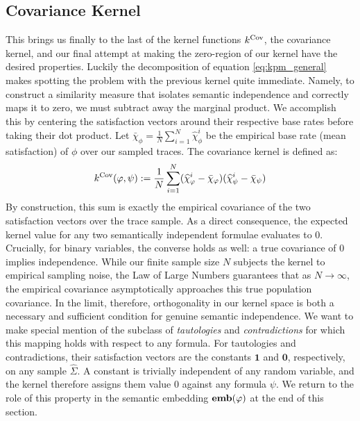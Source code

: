 \documentclass[titlepage,a4paper,11pt]{report}
\begin{document}
    \subsection{Covariance Kernel}
    This brings us finally to the last of the kernel functions $k^{\mathrm{Cov}}$, the covariance kernel, and our final attempt at making  the zero-region of our kernel have the desired properties. Luckily the decomposition of equation \eqref{eq:kpm_general} makes spotting the problem with the previous kernel quite immediate. Namely, to construct a similarity measure that isolates semantic independence and correctly maps it to zero, we must subtract away the marginal product. We accomplish this by centering the satisfaction vectors around their respective base rates before taking their dot product. Let $\bar{\chi}_\phi = \frac{1}{N}\sum_{i=1}^N \widehat{\chi}^i_\phi$ be the empirical base rate (mean satisfaction) of $\phi$ over our sampled traces. The covariance kernel is defined as:
    \begin{equation}\label{eq:covariance_kernel}
        k^{\mathrm{Cov}}(\varphi, \psi) := \frac{1}{N} \sum_{i=1}^N (\widehat{\chi}^i_\varphi - \bar{\chi}_\varphi) (\widehat{\chi}^i_\psi - \bar{\chi}_\psi)
    \end{equation}
    By construction, this sum is exactly the empirical covariance of the two satisfaction vectors over the trace sample. As a direct consequence, the expected kernel value for any two semantically independent formulae evaluates to $0$. Crucially, for binary variables, the converse holds as well: a true covariance of $0$ implies independence. While our finite sample size $N$ subjects the kernel to empirical sampling noise, the Law of Large Numbers guarantees that as $N \to \infty$, the empirical covariance asymptotically approaches this true population covariance. In the limit, therefore, orthogonality in our kernel space is both a necessary and sufficient condition for genuine semantic independence. We want to make special mention of the subclass of \textit{tautologies} and \textit{contradictions} for which this mapping holds with respect to any formula. For tautologies and contradictions, their satisfaction vectors are the constants $\mathbf{1}$ and $\mathbf{0}$, respectively, on any sample $\widehat\Sigma$. A constant is trivially independent of any random variable, and the kernel therefore assigns them value $0$ against any formula $\psi$. We return to the role of this property in the semantic embedding $\textbf{emb}(\varphi)$ at the end of this section.
    
\end{document}
